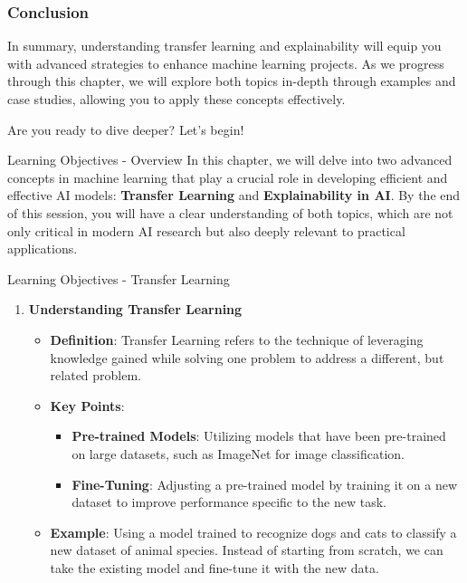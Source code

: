\documentclass[aspectratio=169]{beamer}
\begin{document}
\begin{frame}[fragile]
    \frametitle{Conclusion}
    In summary, understanding transfer learning and explainability will equip you with advanced strategies to enhance machine learning projects. 
    As we progress through this chapter, we will explore both topics in-depth through examples and case studies, allowing you to apply these concepts effectively. 
    
    Are you ready to dive deeper? Let’s begin!
\end{frame}

\begin{frame}[fragile]{Learning Objectives - Overview}
  In this chapter, we will delve into two advanced concepts in machine learning that play a crucial role in developing efficient and effective AI models: 
  \textbf{Transfer Learning} and \textbf{Explainability in AI}. 
  By the end of this session, you will have a clear understanding of both topics, which are not only critical in modern AI research but also deeply relevant to practical applications.
\end{frame}

\begin{frame}[fragile]{Learning Objectives - Transfer Learning}
  \begin{enumerate}
    \item \textbf{Understanding Transfer Learning}
      \begin{itemize}
        \item \textbf{Definition}: 
          Transfer Learning refers to the technique of leveraging knowledge gained while solving one problem to address a different, but related problem.
        \item \textbf{Key Points}:
          \begin{itemize}
            \item \textbf{Pre-trained Models}: Utilizing models that have been pre-trained on large datasets, such as ImageNet for image classification.
            \item \textbf{Fine-Tuning}: Adjusting a pre-trained model by training it on a new dataset to improve performance specific to the new task.
          \end{itemize}
        \item \textbf{Example}: 
          Using a model trained to recognize dogs and cats to classify a new dataset of animal species. Instead of starting from scratch, we can take the existing model and fine-tune it with the new data.
      \end{itemize}
  \end{enumerate}
\end{frame}
\end{document}
